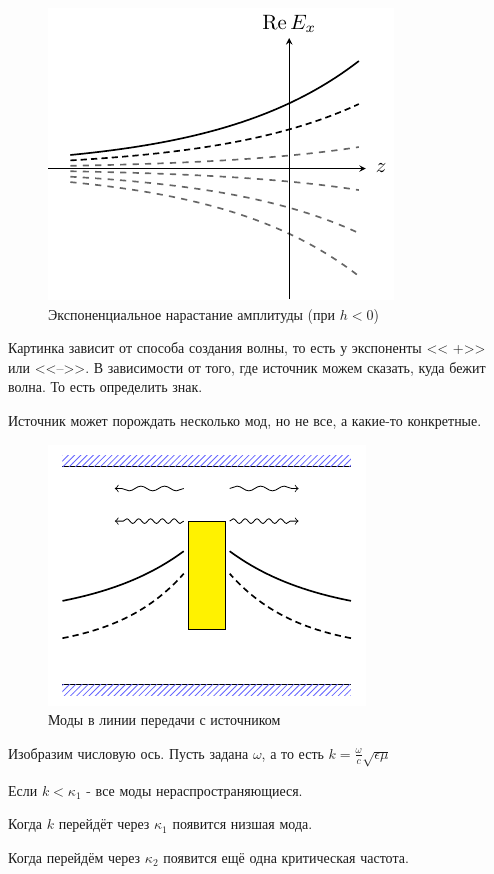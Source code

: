 \begin{figure}[h!]
\centering
\includegraphics[scale=1]{img/lect3_ris3}
\caption{Экспоненциальное нарастание амплитуды (при $h<0$)}
\label{fig:lect3:3}
\end{figure}
Картинка зависит от способа создания волны, то есть у экспоненты << +>> или <<-->>. В зависимости от того, где источник можем сказать, куда бежит волна. То есть определить знак.

Источник может порождать несколько мод, но не все, а какие-то конкретные.
\begin{figure}[h!]
\centering
\includegraphics[scale=1]{img/lect3_ris4}
\caption{Моды в линии передачи с источником}
\label{fig:lect3:4}
\end{figure}
Изобразим числовую ось.
Пусть задана $\omega$, а то есть $k = \frac{\omega}{c} \sqrt{\epsilon \mu}$

Если $k < \kappa_1$ - все моды нераспространяющиеся.

Когда $k$ перейдёт через $\kappa_1$ появится низшая мода.

Когда перейдём через $\kappa_2$  появится ещё одна критическая частота.

